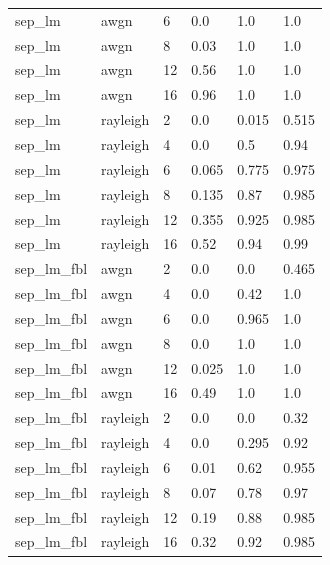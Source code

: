 \begin{tabular}{llllll}
sep\_lm & awgn & 6 & 0.0 & 1.0 & 1.0 \\
sep\_lm & awgn & 8 & 0.03 & 1.0 & 1.0 \\
sep\_lm & awgn & 12 & 0.56 & 1.0 & 1.0 \\
sep\_lm & awgn & 16 & 0.96 & 1.0 & 1.0 \\
sep\_lm & rayleigh & 2 & 0.0 & 0.015 & 0.515 \\
sep\_lm & rayleigh & 4 & 0.0 & 0.5 & 0.94 \\
sep\_lm & rayleigh & 6 & 0.065 & 0.775 & 0.975 \\
sep\_lm & rayleigh & 8 & 0.135 & 0.87 & 0.985 \\
sep\_lm & rayleigh & 12 & 0.355 & 0.925 & 0.985 \\
sep\_lm & rayleigh & 16 & 0.52 & 0.94 & 0.99 \\
sep\_lm\_fbl & awgn & 2 & 0.0 & 0.0 & 0.465 \\
sep\_lm\_fbl & awgn & 4 & 0.0 & 0.42 & 1.0 \\
sep\_lm\_fbl & awgn & 6 & 0.0 & 0.965 & 1.0 \\
sep\_lm\_fbl & awgn & 8 & 0.0 & 1.0 & 1.0 \\
sep\_lm\_fbl & awgn & 12 & 0.025 & 1.0 & 1.0 \\
sep\_lm\_fbl & awgn & 16 & 0.49 & 1.0 & 1.0 \\
sep\_lm\_fbl & rayleigh & 2 & 0.0 & 0.0 & 0.32 \\
sep\_lm\_fbl & rayleigh & 4 & 0.0 & 0.295 & 0.92 \\
sep\_lm\_fbl & rayleigh & 6 & 0.01 & 0.62 & 0.955 \\
sep\_lm\_fbl & rayleigh & 8 & 0.07 & 0.78 & 0.97 \\
sep\_lm\_fbl & rayleigh & 12 & 0.19 & 0.88 & 0.985 \\
sep\_lm\_fbl & rayleigh & 16 & 0.32 & 0.92 & 0.985 \\
\hline
\end{tabular}

